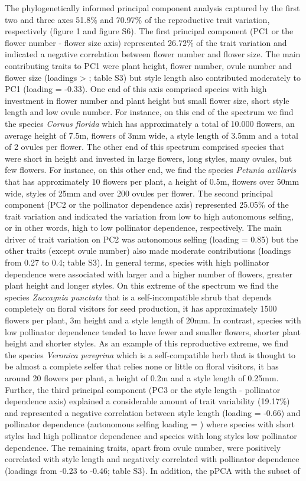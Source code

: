 \documentclass[
  12pt,
  a4paper,
]{article}
\begin{document}
The phylogenetically informed principal component analysis captured by the first two and three axes 51.8\% and 70.97\% of the reproductive trait variation, respectively (figure 1 and figure S6). The first principal component (PC1 or the flower number - flower size axis) represented 26.72\% of the trait variation and indicated a negative correlation between flower number and flower size. The main contributing traits to PC1 were plant height, flower number, ovule number and flower size (loadings \textgreater{} \textbar; table S3) but style length also contributed moderately to PC1 (loading = -0.33). One end of this axis comprised species with high investment in flower number and plant height but small flower size, short style length and low ovule number. For instance, on this end of the spectrum we find the species \emph{Cornus florida} which has approximately a total of 10.000 flowers, an average height of 7.5m, flowers of 3mm wide, a style length of 3.5mm and a total of 2 ovules per flower. The other end of this spectrum comprised species that were short in height and invested in large flowers, long styles, many ovules, but few flowers. For instance, on this other end, we find the species \emph{Petunia axillaris} that has approximately 10 flowers per plant, a height of 0.5m, flowers over 50mm wide, styles of 25mm and over 200 ovules per flower. The second principal component (PC2 or the pollinator dependence axis) represented 25.05\% of the trait variation and indicated the variation from low to high autonomous selfing, or in other words, high to low pollinator dependence, respectively. The main driver of trait variation on PC2 was autonomous selfing (loading = 0.85) but the other traits (except ovule number) also made moderate contributions (loadings from 0.27 to 0.4; table S3). In general terms, species with high pollinator dependence were associated with larger and a higher number of flowers, greater plant height and longer styles. On this extreme of the spectrum we find the species \emph{Zuccagnia punctata} that is a self-incompatible shrub that depends completely on floral visitors for seed production, it has approximately 1500 flowers per plant, 3m height and a style length of 20mm. In contrast, species with low pollinator dependence tended to have fewer and smaller flowers, shorter plant height and shorter styles. As an example of this reproductive extreme, we find the species \emph{Veronica peregrina} which is a self-compatible herb that is thought to be almost a complete selfer that relies none or little on floral visitors, it has around 20 flowers per plant, a height of 0.2m and a style length of 0.25mm. Further, the third principal component (PC3 or the style length - pollinator dependence axis) explained a considerable amount of trait variability (19.17\%) and represented a negative correlation between style length (loading = -0.66) and pollinator dependence (autonomous selfing loading = \textbar) where species with short styles had high pollinator dependence and species with long styles low pollinator dependence. The remaining traits, apart from ovule number, were positively correlated with style length and negatively correlated with pollinator dependence (loadings from -0.23 to -0.46; table S3). In addition, the pPCA with the subset of 
\end{document}
